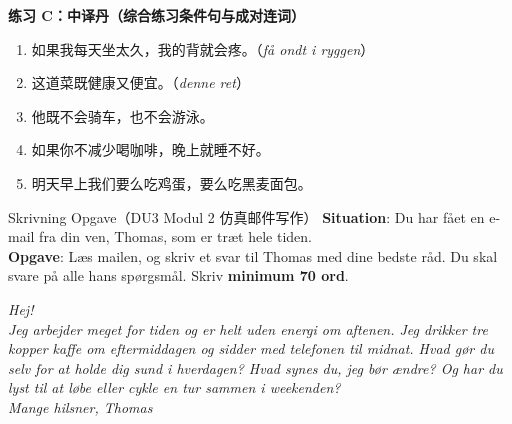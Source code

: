 \textbf{练习 C：中译丹（综合练习条件句与成对连词）}
\begin{enumerate}
  \item 如果我每天坐太久，我的背就会疼。（\textit{få ondt i ryggen}）
  \item 这道菜既健康又便宜。（\textit{denne ret}）
  \item 他既不会骑车，也不会游泳。
  \item 如果你不减少喝咖啡，晚上就睡不好。
  \item 明天早上我们要么吃鸡蛋，要么吃黑麦面包。
\end{enumerate}


\begin{emailbox}{Skrivning Opgave（DU3 Modul 2 仿真邮件写作）}
\textbf{Situation}: Du har fået en e-mail fra din ven, Thomas, som er træt hele tiden.\\
\textbf{Opgave}: Læs mailen, og skriv et svar til Thomas med dine bedste råd. Du skal svare på alle hans spørgsmål. Skriv \textbf{minimum 70 ord}.

\vspace{0.3em}
\textit{Hej!\\
Jeg arbejder meget for tiden og er helt uden energi om aftenen. Jeg drikker tre kopper kaffe om eftermiddagen og sidder med telefonen til midnat. Hvad gør du selv for at holde dig sund i hverdagen? Hvad synes du, jeg bør ændre? Og har du lyst til at løbe eller cykle en tur sammen i weekenden?\\
Mange hilsner, Thomas}
\end{emailbox}

